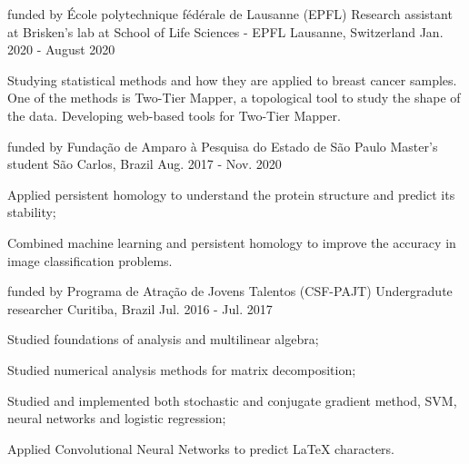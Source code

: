 

\begin{cventries}

  \cventry
    {funded by École polytechnique fédérale de Lausanne (EPFL)}
    {Research assistant at Brisken's lab at School of Life Sciences - EPFL}
    {Lausanne, Switzerland} 
    {Jan. 2020 - August 2020} 
    {
      \begin{cvitems} 
        \item {Studying statistical methods and how they are applied 
            to breast cancer samples. One of the methods is 
            Two-Tier Mapper, a topological tool to study the shape of the data.
            Developing web-based tools for Two-Tier Mapper.}
      \end{cvitems} 
    }
  \cventry
    {funded by Fundação de Amparo à Pesquisa do Estado de São Paulo} %
    {Master's student} %
    {São Carlos, Brazil} %
    {Aug. 2017 - Nov. 2020} %
    {
      \begin{cvitems} %
        \item {Applied persistent homology to understand the protein structure
        and predict its stability;}
        \item {Combined machine learning and persistent homology to improve
        the accuracy in image classification problems.}
      \end{cvitems}
    }

\cventry
  {funded by Programa de Atração de Jovens Talentos (CSF-PAJT)} %
  {Undergradute researcher} %
  {Curitiba, Brazil} %
  {Jul. 2016 - Jul. 2017} %
  {
    \begin{cvitems} %
      \item {Studied foundations of analysis and multilinear algebra;}
      \item {Studied numerical analysis methods for matrix decomposition;}
      \item {Studied and implemented both stochastic and conjugate gradient
      method, SVM, neural networks and logistic regression;}
      \item {Applied Convolutional Neural Networks to predict LaTeX characters.}
    \end{cvitems}
  }

\end{cventries}
